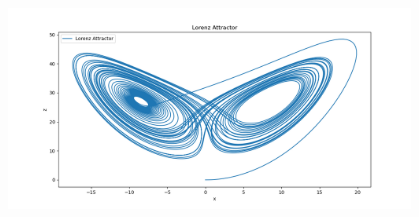 \documentclass[11pt]{article}
\begin{document}
\begin{figure}[b!]
\centering
\includegraphics[width=0.95\textwidth]{Lorenz Attractor.png}
\end{figure}
\end{document}
